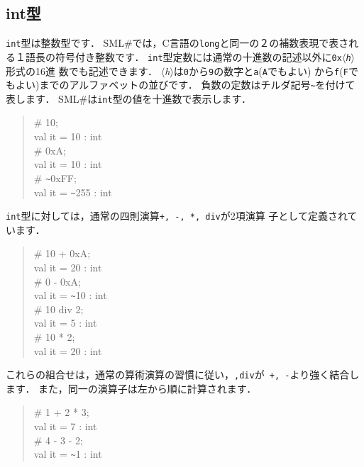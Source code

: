 \documentclass{jbook}
\newcommand{\smlsharp}{SML\#}
\newcommand{\code}[1]{\mbox{\large\tt #1}}
\newcommand{\nonterm}[1]{\mbox{$\langle$}{\it #1}\mbox{$\rangle$}}
\newenvironment{program}{\begin{quote}\begin{tt}}%
                        {\end{tt}\end{quote}}
\begin{document}
\subsection{int型}
	{\tt int}型は整数型です．
	\smlsharp{}では，C言語の\code{long}と同一の２の補数表現で表され
る１語長の符号付き整数です．
	{\tt int}型定数には通常の十進数の記述以外に{\tt 0x\nonterm{h}}形式の16進
数でも記述できます．
	\nonterm{h}は{\tt 0}から{\tt 9}の数字と{\tt a}({\tt A}でもよい)
から{\tt f}({\tt F}でもよい)までのアルファベットの並びです．
	負数の定数はチルダ記号\verb|~|を付けて表します．
	\smlsharp{}は{\tt int}型の値を十進数で表示します．
\begin{program}
\# 10;\\
val it = 10 : int\\
\# 0xA;\\
val it = 10 : int\\
\# \verb|~|0xFF;\\
val it = \verb|~|255 : int
\end{program}
	{\tt int}型に対しては，通常の四則演算{\tt +, -, *, div}が2項演算
子として定義されています．
\begin{program}
\# 10 + 0xA;\\
val it = 20 : int\\
\# 0 - 0xA;\\
val it = \verb|~|10 : int\\
\# 10 div 2;\\
val it = 5 : int\\
\# 10 * 2;\\
val it = 20 : int
\end{program}
	これらの組合せは，通常の算術演算の習慣に従い，{\tt *,div}が{\tt
+, -}より強く結合します．
	また，同一の演算子は左から順に計算されます．
\begin{program}
\# 1 + 2 * 3;\\
val it = 7 : int\\
\# 4 - 3 - 2;\\
val it = \verb|~|1 : int
\end{program}
\end{document}
